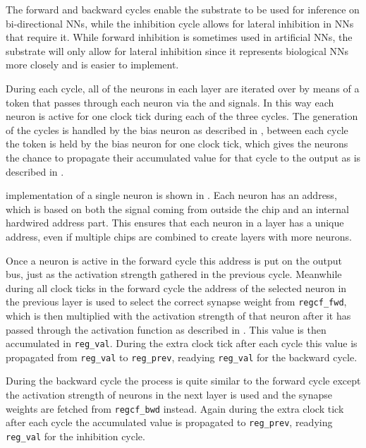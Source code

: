 The forward and backward cycles enable the substrate to be used for inference on bi-directional \acp{NN}, while the inhibition cycle allows for lateral inhibition in \acp{NN} that require it. While forward inhibition is sometimes used in artificial \acp{NN}, the substrate will only allow for lateral inhibition since it represents biological \acp{NN} more closely and is easier to implement.

During each cycle, all of the neurons in each layer are iterated over by means of a token that passes through each neuron via the  and  signals. In this way each neuron is active for one clock tick during each of the three cycles. The generation of the cycles is handled by the bias neuron as described in , between each cycle the token is held by the bias neuron for one clock tick, which gives the neurons the chance to propagate their accumulated value for that cycle to the output as is described in .

 implementation of a single neuron is shown in . Each neuron has an address, which is based on both the  signal coming from outside the chip and an internal hardwired address part. This ensures that each neuron in a layer has a unique address, even if multiple chips are combined to create layers with more neurons.

Once a neuron is active in the forward cycle this address is put on the output bus, just as the activation strength gathered in the previous cycle. Meanwhile during all clock ticks in the forward cycle the address of the selected neuron in the previous layer is used to select the correct synapse weight from \texttt{regcf\_fwd}, which is then multiplied with the activation strength of that neuron after it has passed through the activation function as described in . This value is then accumulated in \texttt{reg\_val}. During the extra clock tick after each cycle this value is propagated from \texttt{reg\_val} to \texttt{reg\_prev}, readying \texttt{reg\_val} for the backward cycle.

During the backward cycle the process is quite similar to the forward cycle except the activation strength of neurons in the next layer is used and the synapse weights are fetched from \texttt{regcf\_bwd} instead. Again during the extra clock tick after each cycle the accumulated value is propagated to \texttt{reg\_prev}, readying \texttt{reg\_val} for the inhibition cycle.

